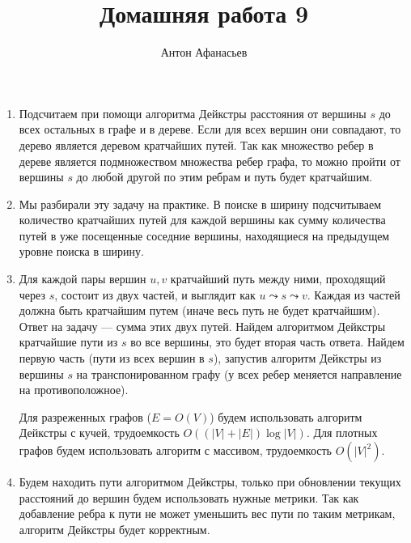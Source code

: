 \documentclass[10pt]{article}
\begin{document}
\title{Домашняя работа 9}
\author{Антон Афанасьев}
\maketitle

\begin{enumerate}

\item Подсчитаем при помощи алгоритма Дейкстры расстояния от вершины $s$ до всех остальных в графе и в дереве. Если для всех вершин они совпадают, то дерево является деревом кратчайших путей. Так как множество ребер в дереве является подмножеством множества ребер графа, то можно пройти от вершины $s$ до любой другой по этим ребрам и путь будет кратчайшим.

\item Мы разбирали эту задачу на практике. В поиске в ширину подсчитываем количество кратчайших путей для каждой вершины как сумму количества путей в уже посещенные соседние вершины, находящиеся на предыдущем уровне поиска в ширину.

\item Для каждой пары вершин $u, v$ кратчайший путь между ними, проходящий через $s$, состоит из двух частей, и выглядит как $u \leadsto s \leadsto v$. Каждая из частей должна быть кратчайшим путем (иначе весь путь не будет кратчайшим). Ответ на задачу --- сумма этих двух путей. Найдем алгоритмом Дейкстры кратчайшие пути из $s$ во все вершины, это будет вторая часть ответа. Найдем первую часть (пути из всех вершин в $s$), запустив алгоритм Дейкстры из вершины $s$ на транспонированном графу (у всех ребер меняется направление на противоположное).

Для разреженных графов ($E=O(V)$) будем использовать алгоритм Дейкстры с кучей, трудоемкость $O((|V| + |E|) \log |V|)$. Для плотных графов будем использовать алгоритм с массивом, трудоемкость $O(|V|^2)$.

\item Будем находить пути алгоритмом Дейкстры, только при обновлении текущих расстояний до вершин будем использовать нужные метрики. Так как добавление ребра к пути не может уменьшить вес пути по таким метрикам, алгоритм Дейкстры будет корректным.

\end{enumerate}
\end{document}
